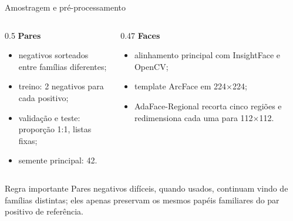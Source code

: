 \documentclass[aspectratio=169,10pt]{beamer}
\begin{document}
\begin{frame}{Amostragem e pré-processamento}
  \begin{columns}[T,onlytextwidth]
    \begin{column}{0.5\textwidth}
      \textbf{Pares}
      \begin{itemize}
        \item negativos sorteados entre famílias diferentes;
        \item treino: 2 negativos para cada positivo;
        \item validação e teste: proporção 1:1, listas fixas;
        \item semente principal: 42.
      \end{itemize}
    \end{column}
    \begin{column}{0.47\textwidth}
      \textbf{Faces}
      \begin{itemize}
        \item alinhamento principal com InsightFace e OpenCV;
        \item template ArcFace em 224$\times$224;
        \item AdaFace-Regional recorta cinco regiões e redimensiona cada uma para 112$\times$112.
      \end{itemize}
    \end{column}
  \end{columns}

  \vspace{0.4cm}
  \begin{block}{Regra importante}
    Pares negativos difíceis, quando usados, continuam vindo de famílias distintas; eles apenas preservam os mesmos papéis familiares do par positivo de referência.
  \end{block}
\end{frame}
\end{document}

